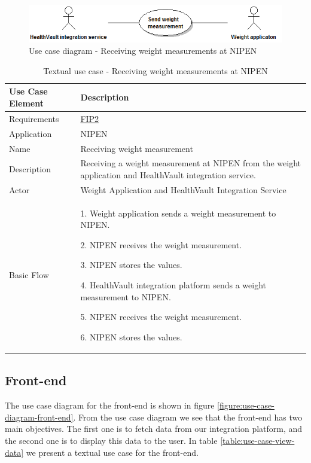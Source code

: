 \begin{figure}[H]
\centering
\includegraphics[scale=0.6]{../Figures/use-case-diagram-nipen-weight.png}
\caption{Use case diagram - Receiving weight measurements at NIPEN}
\label{figure:use-case-diagram-nipen-weight}
\end{figure}

\begin{table}[H]
\begin{center}
\begin{tabular}{ l | p{10cm} }
  \hline
  \textbf{Use Case Element} & \textbf{Description} \\ \hline\hline
  Requirements & \hyperref[table:reqip]{FIP2} \\ \hline
  Application & NIPEN \\ \hline
  Name & Receiving weight measurement \\ \hline
  Description & Receiving a weight measurement at NIPEN from the weight application and HealthVault integration service. \\ \hline
  Actor & Weight Application and HealthVault Integration Service \\ \hline
  Basic Flow & 
  	\par 1. Weight application sends a weight measurement to NIPEN.
  	\par 2. NIPEN receives the weight measurement.
  	\par 3. NIPEN stores the values.
  	\par 4. HealthVault integration platform sends a weight measurement to NIPEN.
  	\par 5. NIPEN receives the weight measurement.
  	\par 6. NIPEN stores the values.
  	\\ \hline
\end{tabular}
\end{center}
\caption{Textual use case - Receiving weight measurements at NIPEN}
\label{table:use-case-receive-weight}
\end{table}


\subsection{Front-end}

The use case diagram for the front-end is shown in figure \ref{figure:use-case-diagram-front-end}.
From the use case diagram we see that the front-end has two main objectives.
The first one is to fetch data from our integration platform, and the second one is to display this data to the user.
In table \ref{table:use-case-view-data} we present a textual use case for the front-end.

